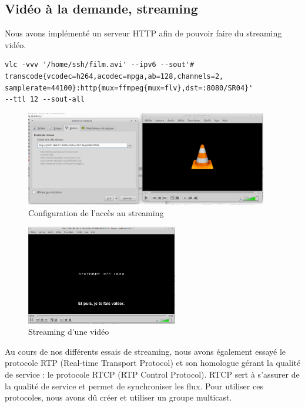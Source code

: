    
	\subsection{Vidéo à la demande, streaming}
    
    	Nous avons implémenté un serveur HTTP afin de pouvoir faire du streaming vidéo.
        \begin{lstlisting}[frame=single]
vlc -vvv '/home/ssh/film.avi' --ipv6 --sout'#
transcode{vcodec=h264,acodec=mpga,ab=128,channels=2,
samplerate=44100}:http{mux=ffmpeg{mux=flv},dst=:8080/SR04}'
--ttl 12 --sout-all 
        \end{lstlisting}
        
        \begin{figure}[!h]
        \includegraphics[width=400px]{figures/qos-vlc-config.png}
        \centering
        \caption{Configuration de l'accès au streaming}
        \end{figure}

        \begin{figure}[h]
        \includegraphics[width=250px]{figures/qos-vlc-stream.png}
        \centering
        \caption{Streaming d'une vidéo}
        \end{figure}

   Au cours de nos différents essais de streaming, nous avons également essayé le protocole RTP (Real-time Transport Protocol) et son homologue gérant la qualité de service : le protocole RTCP (RTP Control Protocol). RTCP sert à s'assurer de la qualité de service et permet de synchroniser les flux. Pour utiliser ces protocoles, nous avons dû créer et utiliser un groupe multicast. 
    
